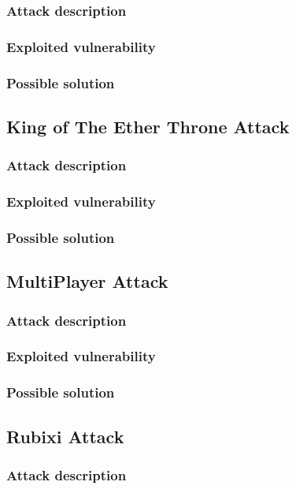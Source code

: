 \subsubsection{Attack description}
\subsubsection{Exploited vulnerability}
\subsubsection{Possible solution}

\subsection{King of The Ether Throne Attack}
\subsubsection{Attack description}
\subsubsection{Exploited vulnerability}
\subsubsection{Possible solution}

\subsection{MultiPlayer Attack}
\subsubsection{Attack description}
\subsubsection{Exploited vulnerability}
\subsubsection{Possible solution}

\subsection{Rubixi Attack}
\subsubsection{Attack description}
